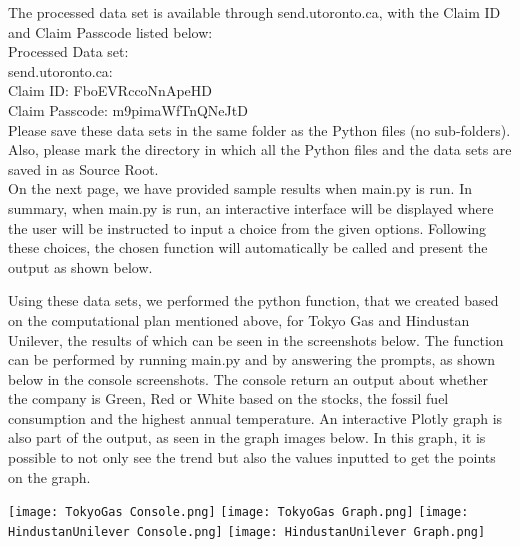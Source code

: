 \documentclass[fontsize=11pt]{article}
\begin{document}
The processed data set is available through send.utoronto.ca, with the Claim ID and Claim Passcode listed below: \\

\noindent Processed Data set: \\
    send.utoronto.ca: \\
    Claim ID: FboEVRccoNnApeHD \\
    Claim Passcode: m9pimaWfTnQNeJtD \\

Please save these data sets in the same folder as the Python files (no sub-folders). Also, please mark the directory in which all the Python files and the data sets are saved in as Source Root.\\

On the next page, we have provided sample results when main.py is run. In summary, when main.py is run, an interactive interface will be displayed where the user will be instructed to input a choice from the given options. Following these choices, the chosen function will automatically be called and present the output as shown below. \\

\pagebreak

Using these data sets, we performed the python function, that we created based on the computational plan mentioned above, for Tokyo Gas and Hindustan Unilever, the results of which can be seen in the screenshots below. The function can be performed by running main.py and by answering the prompts, as shown below in the console screenshots. The console return an output about whether the company is Green, Red or White based on the stocks, the fossil fuel consumption and the highest annual temperature. An interactive Plotly graph is also part of the output, as seen in the graph images below. In this graph, it is possible to not only see the trend but also the values inputted to get the points on the graph.\\
\begin{center}
\texttt{[image: TokyoGas Console.png]}
\texttt{[image: TokyoGas Graph.png]}
\texttt{[image: HindustanUnilever Console.png]}
\texttt{[image: HindustanUnilever Graph.png]}

\end{center}
\end{document}
